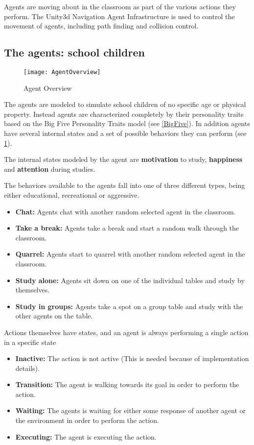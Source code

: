 Agents are moving about in the classroom as part of the various actions they perform.
The Unity3d Navigation Agent Infrastructure is used to control the movement of agents,
including path finding and collision control.

\label{agent}
\subsection{The agents: school children}

\begin{figure}[]
    \centering
    \texttt{[image: AgentOverview]}
    \caption{Agent Overview}
    \label{AgentOverview}
\end{figure}

The agents are modeled to simulate school children of no specific age or physical
property. Instead agents are characterized completely by their personality traits
based on the Big Five Personality Traits model (see \ref{BigFive}). In addition
agents have several internal states and a set of possible behaviors they can perform (see \ref{AgentOverview}).

The internal states modeled by the agent are \textbf{motivation} to study, \textbf{happiness}
and \textbf{attention} during studies.

The behaviors available to the agents fall into one of three different types, being
either educational, recreational or aggressive.

\begin{itemize}
    \item \textbf{Chat:} Agents chat with another random selected agent in the classroom.
    \item \textbf{Take a break:} Agents take a break and start a random walk through the classroom.
    \item \textbf{Quarrel:} Agents start to quarrel with another random selected agent in the classroom.
    \item \textbf{Study alone:} Agents sit down on one of the individual tables and study by themselves.
    \item \textbf{Study in groups:} Agents take a spot on a group table and study with the other agents on the table.
\end{itemize}

Actions themselves have states, and an agent is always performing a single action
in a specific state

\begin{itemize}
    \item \textbf{Inactive:} The action is not active (This is needed because of implementation details). 
    \item \textbf{Transition:} The agent is walking towards its goal in order to perform the action.
    \item \textbf{Waiting:} The agents is waiting for either some response of another agent or the environment in order to perform the action.
    \item \textbf{Executing:} The agent is executing the action.
\end{itemize}


